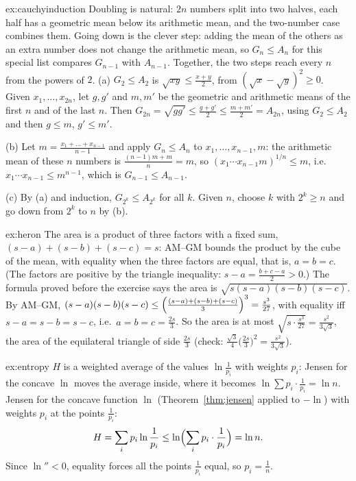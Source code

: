 \begin{solution}{ex:cauchyinduction}
\idea Doubling is natural: $2n$ numbers split into two halves, each half has a geometric mean below its arithmetic mean, and the two-number case combines them. Going down is the clever step: adding the mean of the others as an extra number does not change the arithmetic mean, so $G_n\le A_n$ for this special list compares $G_{n-1}$ with $A_{n-1}$. Together, the two steps reach every $n$ from the powers of $2$.
\writeup (a) $G_2\le A_2$ is $\sqrt{xy}\le\frac{x+y}2$, from $(\sqrt x-\sqrt y)^2\ge0$. Given $x_1,\dots,x_{2n}$, let $g,g'$ and $m,m'$ be the geometric and arithmetic means of the first $n$ and of the last $n$. Then $G_{2n}=\sqrt{gg'}\le\frac{g+g'}2\le\frac{m+m'}2=A_{2n}$, using $G_2\le A_2$ and then $g\le m$, $g'\le m'$.

(b) Let $m=\frac{x_1+\dots+x_{n-1}}{n-1}$ and apply $G_n\le A_n$ to $x_1,\dots,x_{n-1},m$: the arithmetic mean of these $n$ numbers is $\frac{(n-1)m+m}n=m$, so $(x_1\cdots x_{n-1}m)^{1/n}\le m$, i.e.\ $x_1\cdots x_{n-1}\le m^{n-1}$, which is $G_{n-1}\le A_{n-1}$.

(c) By (a) and induction, $G_{2^k}\le A_{2^k}$ for all $k$. Given $n$, choose $k$ with $2^k\ge n$ and go down from $2^k$ to $n$ by (b).
\end{solution}

\begin{solution}{ex:heron}
\idea The area is a product of three factors with a fixed sum, $(s-a)+(s-b)+(s-c)=s$: AM--GM bounds the product by the cube of the mean, with equality when the three factors are equal, that is, $a=b=c$. (The factors are positive by the triangle inequality: $s-a=\frac{b+c-a}2>0$.)
\writeup The formula proved before the exercise says the area is $\sqrt{s(s-a)(s-b)(s-c)}$. By AM--GM, $(s-a)(s-b)(s-c)\le\Bigl(\frac{(s-a)+(s-b)+(s-c)}3\Bigr)^3=\frac{s^3}{27}$, with equality iff $s-a=s-b=s-c$, i.e.\ $a=b=c=\frac{2s}3$. So the area is at most $\sqrt{s\cdot\frac{s^3}{27}}=\frac{s^2}{3\sqrt3}$, the area of the equilateral triangle of side $\frac{2s}3$ (check: $\frac{\sqrt3}4\bigl(\frac{2s}3\bigr)^2=\frac{s^2}{3\sqrt3}$).
\end{solution}

\begin{solution}{ex:entropy}
\idea $H$ is a weighted average of the values $\ln\frac1{p_i}$ with weights $p_i$: Jensen for the concave $\ln$ moves the average inside, where it becomes $\ln\sum p_i\cdot\frac1{p_i}=\ln n$.
\writeup Jensen for the concave function $\ln$ (Theorem~\ref{thm:jensen} applied to $-\ln$) with weights $p_i$ at the points $\frac1{p_i}$:
\[
H=\sum_ip_i\ln\frac1{p_i}\le\ln\Bigl(\sum_ip_i\cdot\frac1{p_i}\Bigr)=\ln n.
\]
Since $\ln''<0$, equality forces all the points $\frac1{p_i}$ equal, so $p_i=\frac1n$.
\end{solution}

